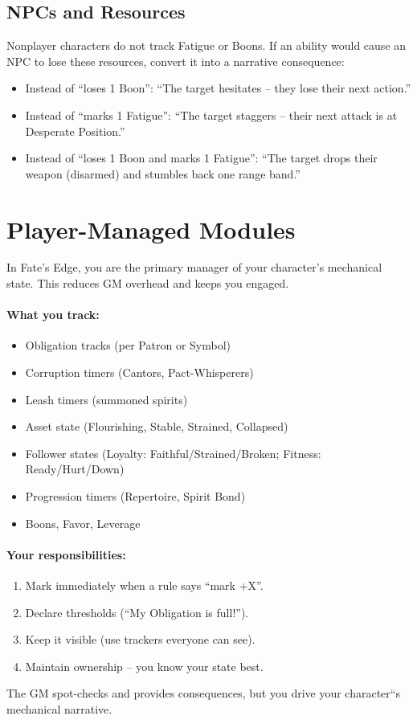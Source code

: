 \subsection{NPCs and Resources}\label{subsec:npc_resources}

Nonplayer characters do not track Fatigue or Boons. If an ability would cause an
NPC to lose these resources, convert it into a narrative consequence:
\begin{itemize}
    \item Instead of ``loses 1 Boon'': ``The target hesitates -- they lose their next action.''
    \item Instead of ``marks 1 Fatigue'': ``The target staggers -- their next attack is at Desperate Position.''
    \item Instead of ``loses 1 Boon and marks 1 Fatigue'': ``The target drops their weapon (disarmed) and stumbles back one range band.''
\end{itemize}

\section{Player-Managed Modules}\label{sec:player_managed_modules}

In Fate's Edge, you are the primary manager of your character's mechanical state.
This reduces GM overhead and keeps you engaged.

\paragraph{What you track:}
\begin{itemize}
    \item Obligation tracks (per Patron or Symbol)
    \item Corruption timers (Cantors, Pact-Whisperers)
    \item Leash timers (summoned spirits)
    \item Asset state (Flourishing, Stable, Strained, Collapsed)
    \item Follower states (Loyalty: Faithful/Strained/Broken; Fitness: Ready/Hurt/Down)
    \item Progression timers (Repertoire, Spirit Bond)
    \item Boons, Favor, Leverage
\end{itemize}

\paragraph{Your responsibilities:}
\begin{enumerate}
    \item Mark immediately when a rule says ``mark +X''.
    \item Declare thresholds (``My Obligation is full!'').
    \item Keep it visible (use trackers everyone can see).
    \item Maintain ownership -- you know your state best.
\end{enumerate}
The GM spot-checks and provides consequences, but you drive your character``s
mechanical narrative.

